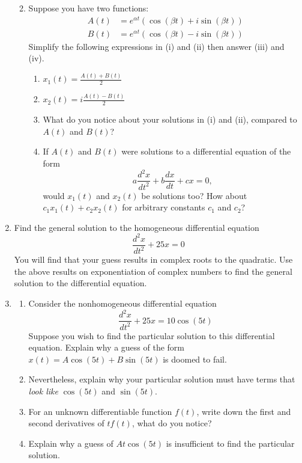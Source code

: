 \begin{enumerate}[resume]
\begin{enumerate}
\clearpage

\item Suppose you have two functions: \label{13problem13partc}
\begin{align*}
A(t) &= e^{\alpha t} (\cos(\beta t) + i\sin(\beta t)) \\
B(t) &= e^{\alpha t} (\cos(\beta t) - i\sin(\beta t))
\end{align*}
Simplify the following expressions in (i) and (ii) then answer (iii) and (iv).
\begin{enumerate}
\item $x_1(t) = \displaystyle\frac{A(t) + B(t)}{2}$ \label{13problem13partci} \vfill
\item $x_2(t) = i\displaystyle\frac{A(t) - B(t)}{2}$ \label{13problem13partcii} \vfill
\item What do you notice about your solutions in (i) and (ii), compared to $A(t)$ and $B(t)$? \label{13problem13partciii} \vfill
\item If $A(t)$ and $B(t)$ were solutions to a differential equation of the form
\[
a\frac{d^2x}{dt^2} + b\frac{dx}{dt} + cx = 0,
\]
would $x_1(t)$ and $x_2(t)$ be solutions too? How about $c_1x_1(t) + c_2x_2(t)$ for arbitrary constants $c_1$ and $c_2$? \label{13problem13partciv} \vfill
\end{enumerate}
 
\end{enumerate}

\clearpage

\item Find the general solution to the homogeneous differential equation \label{13problem14} 
\[
\frac{d^2x}{dt^2}+25x=0
\]
You will find that your guess results in complex roots to the quadratic.  Use the above results on exponentiation of complex numbers to find the general solution to the differential equation. \vspace{1.75in}

\item \label{13problem15}
\begin{enumerate}
\item Consider the nonhomogeneous differential equation \label{13problem15parta}
\[
\frac{d^2x}{dt^2}+25x=10\cos(5t)
\]
Suppose you wish to find the particular solution to this differential equation. Explain why a guess of the form $x(t) = A\cos(5t) + B\sin(5t)$ is doomed to fail. \vfill
\item Nevertheless, explain why your particular solution must have terms that \textit{look like} $\cos(5t)$ and $\sin(5t)$. \label{13problem15partb} \vfill
\item For an unknown differentiable function $f(t)$, write down the first and second derivatives of $tf(t)$, what do you notice? \label{13problem15partc} \vfill
\item Explain why a guess of $At\cos(5t)$ is insufficient to find the particular solution. \label{13problem15partd} \vfill


\end{enumerate}
\end{enumerate}
